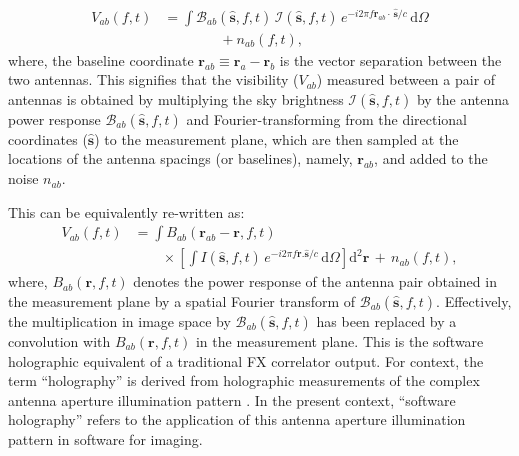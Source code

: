 \documentclass[a4paper,fleqn,usenatbib]{mnras}
\newcommand{\dif}{\mathrm{d}}
\begin{document}
\begin{align}\label{eqn:measurement-eqn-1}
  V_{ab}(f,t) &= \int \mathcal{B}_{ab}(\hat{\mathbf{s}},f,t)\,\mathcal{I}(\hat{\mathbf{s}},f,t)\,e^{-i 2\pi f\mathbf{r}_{ab}\!\cdot\,\hat{\mathbf{s}}/c}\,\dif\Omega \nonumber\\
  &\qquad\qquad + n_{ab}(f,t),
\end{align}
where, the baseline coordinate $\mathbf{r}_{ab}\equiv\mathbf{r}_a-\mathbf{r}_b$ is the vector separation between the two antennas. This signifies that the visibility ($V_{ab}$) measured between a pair of antennas is obtained by multiplying the sky brightness $\mathcal{I}(\hat{\mathbf{s}},f,t)$ by the antenna power response $\mathcal{B}_{ab}(\hat{\mathbf{s}},f,t)$ and Fourier-transforming from the directional coordinates ($\hat{\mathbf{s}}$) to the measurement plane, which are then sampled at the locations of the antenna spacings (or baselines), namely, $\mathbf{r}_{ab}$, and added to the noise $n_{ab}$. 

This can be equivalently re-written as:
\begin{align}\label{eqn:software-holography}
  V_{ab}(f,t) &= \int B_{ab}(\mathbf{r}_{ab}-\mathbf{r},f,t) \nonumber\\ 
              &\qquad \times \left[\int I(\hat{\mathbf{s}},f,t)\,e^{-i 2\pi f\mathbf{r}.\hat{\mathbf{s}}/c}\,\dif\Omega\right]\dif^2\mathbf{r}\,+\, n_{ab}(f,t),
\end{align}
where, $B_{ab}(\mathbf{r},f,t)$ denotes the power response of the antenna pair obtained in the measurement plane by a spatial Fourier transform of $\mathcal{B}_{ab}(\hat{\mathbf{s}},f,t)$. Effectively, the multiplication in image space by $\mathcal{B}_{ab}(\hat{\mathbf{s}},f,t)$ has been replaced by a convolution with $B_{ab}(\mathbf{r},f,t)$ in the measurement plane. This is the software holographic equivalent of a traditional FX correlator output. For context, the term ``holography'' is derived from holographic measurements of the complex antenna aperture illumination pattern \citep{ben76,sco77}. In the present context, ``software holography'' refers to the application of this antenna aperture illumination pattern in software for imaging.
\end{document}
